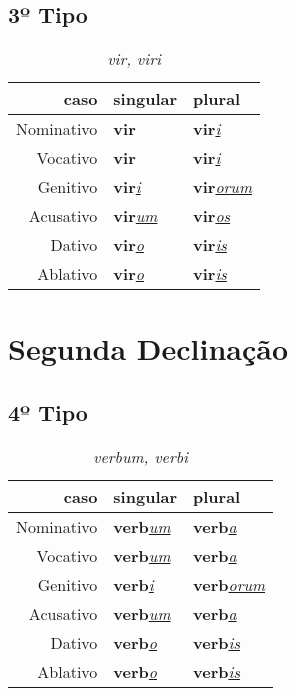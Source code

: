 \documentclass{article}
\newcommand{\radicaldesinencia}[2]{\textbf{#1}\textit{\underline{#2}}}
\begin{document}
\subsection*{3º Tipo}
\begin{table}[H]
\centering
\caption*{\textit{vir, viri}}
\vspace{0.2cm}
\begin{tabular}{r|l|l}
\hline
caso			&	singular					& plural 						\\
\hline                                    		
\hline
Nominativo	&	\radicaldesinencia{vir}{}	& \radicaldesinencia{vir}{i}	\\
Vocativo		&	\radicaldesinencia{vir}{}	& \radicaldesinencia{vir}{i}	\\
Genitivo		&	\radicaldesinencia{vir}{i}	& \radicaldesinencia{vir}{orum}	\\
Acusativo	&	\radicaldesinencia{vir}{um}	& \radicaldesinencia{vir}{os}	\\
Dativo		&	\radicaldesinencia{vir}{o}	& \radicaldesinencia{vir}{is}		\\
Ablativo		&	\radicaldesinencia{vir}{o}	& \radicaldesinencia{vir}{is}		\\


 \hline
\end{tabular}
\end{table}
\clearpage





\section*{Segunda Declinação}
\subsection*{4º Tipo}
\begin{table}[H]
\centering
\caption*{\textit{verbum, verbi}}
\vspace{0.2cm}
\begin{tabular}{r|l|l}
\hline
caso			&	singular					& plural 						\\
\hline                                    		
\hline
Nominativo	&	\radicaldesinencia{verb}{um}	& \radicaldesinencia{verb}{a}		\\
Vocativo		&	\radicaldesinencia{verb}{um}	& \radicaldesinencia{verb}{a}		\\
Genitivo		&	\radicaldesinencia{verb}{i}		& \radicaldesinencia{verb}{orum}		\\
Acusativo	&	\radicaldesinencia{verb}{um}	& \radicaldesinencia{verb}{a}		\\
Dativo		&	\radicaldesinencia{verb}{o}		& \radicaldesinencia{verb}{is}		\\
Ablativo		&	\radicaldesinencia{verb}{o}		& \radicaldesinencia{verb}{is}		\\


 \hline
\end{tabular}
\end{table}
\clearpage
\end{document}
